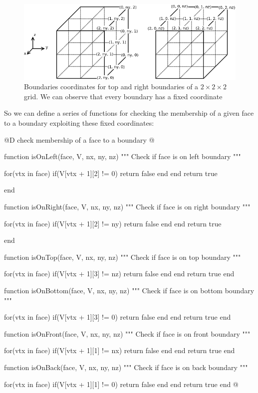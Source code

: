 \documentclass[11pt,oneside]{article}	%
\begin{document}
\begin{figure}[htb] %
   \centering
   \includegraphics[width=0.90\linewidth]{images/boundariesCoordinates.png}
   \caption{Boundaries coordinates for top and right boundaries of a $2 \times 2 \times 2$ grid. We can observe that every boundary has a fixed coordinate}
   \label{fig:boundariesCoordinates}
\end{figure}

So we can define a series of functions for checking the membership of a given face to a boundary exploiting these fixed coordinates:

@D check membership of a face to a boundary
@{function isOnLeft(face, V, nx, ny, nz)
  """
  Check if face is on left boundary
  """

  for(vtx in face)
    if(V[vtx + 1][2] != 0)
      return false
    end
  end
  return true

end

function isOnRight(face, V, nx, ny, nz)
  """
  Check if face is on right boundary
  """

  for(vtx in face)
    if(V[vtx + 1][2] != ny)
      return false
    end
  end
  return true

end

function isOnTop(face, V, nx, ny, nz)
  """
  Check if face is on top boundary
  """

  for(vtx in face)
    if(V[vtx + 1][3] != nz)
      return false
    end
  end
  return true
end

function isOnBottom(face, V, nx, ny, nz)
  """
  Check if face is on bottom boundary
  """

  for(vtx in face)
    if(V[vtx + 1][3] != 0)
      return false
    end
  end
  return true
end

function isOnFront(face, V, nx, ny, nz)
  """
  Check if face is on front boundary
  """

  for(vtx in face)
    if(V[vtx + 1][1] != nx)
      return false
    end
  end
  return true
end

function isOnBack(face, V, nx, ny, nz)
  """
  Check if face is on back boundary
  """

  for(vtx in face)
    if(V[vtx + 1][1] != 0)
      return false
    end
  end
  return true
end @}
\end{document}
